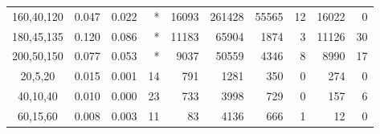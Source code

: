 \documentclass[smallextended]{svjour3hack}       %
\begin{document}
\begin{table}[!ht]
\begin{tabular}{c|r|r|r|r|r|r|r|rr}
160,40,120          & 0.047                                     & 0.022                                & *                                           & 16093                                     & 261428                                   & 55565                                     & 12                                      & 16022                                     & 0                                         \\
180,45,135          & 0.120                                     & 0.086                                & *                                           & 11183                                     & 65904                                    & 1874                                      & 3                                       & 11126                                     & 30                                        \\
200,50,150          & 0.077                                     & 0.053                                & *                                           & 9037                                      & 50559                                    & 4346                                      & 8                                       & 8990                                      & 17       \\
\hline
20,5,20             & 0.015                                     & 0.001                                & 14                                          & 791                                       & 1281                                     & 350                                       & 0                                       & 274                                       & 0                                         \\
40,10,40            & 0.010                                     & 0.000                                & 23                                          & 733                                       & 3998                                     & 729                                       & 0                                       & 157                                       & 6                                         \\
60,15,60            & 0.008                                     & 0.003                                & 11                                          & 83                                        & 4136                                     & 666                                       & 1                                       & 12                                        & 0                                         \\

\end{tabular}
\end{table}
\end{document}
